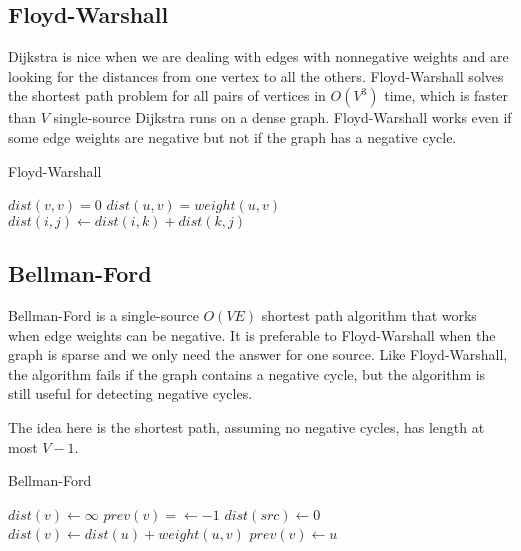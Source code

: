 \subsection{Floyd-Warshall}

Dijkstra is nice when we are dealing with edges with nonnegative weights and are looking for the distances from one vertex to all the others. Floyd-Warshall solves the shortest path problem for all pairs of vertices in $O(V^3)$ time, which is faster than $V$ single-source Dijkstra runs on a dense graph. Floyd-Warshall works even if some edge weights are negative but not if the graph has a negative cycle.

\begin{algorithm}[H]
\caption{Floyd-Warshall}
\begin{algorithmic}
	\State $dist(v,v)=0$
\EndFor
{}
	\State $dist(u,v)=weight(u,v)$
\EndFor
{}
            	\State $dist(i,j) \gets dist(i,k)+dist(k,j)$
            \EndIf
        \EndFor
    \EndFor
\EndFor
\end{algorithmic}
\end{algorithm}

\subsection{Bellman-Ford}

Bellman-Ford is a single-source $O(VE)$ shortest path algorithm that works when edge weights can be negative. It is preferable to Floyd-Warshall when the graph is sparse and we only need the answer for one source. Like Floyd-Warshall, the algorithm fails if the graph contains a negative cycle, but the algorithm is still useful for detecting negative cycles.

The idea here is the shortest path, assuming no negative cycles, has length at most $V-1$.

\begin{algorithm}[H]
\caption{Bellman-Ford}
\begin{algorithmic}
	\State $dist(v)\gets\infty$
    \State $prev(v)=\gets -1$
\EndFor
\State $dist(src) \gets 0$
    	    \State $dist(v) \gets dist(u)+weight(u,v)$
	        \State $prev(v) \gets u$
        \EndIf
	\EndFor
\EndFor
{}
	\EndIf
\EndFor
\end{algorithmic}
\end{algorithm}


